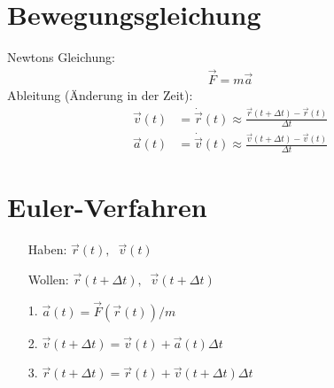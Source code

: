 \documentclass[a4paper, 14pt, fleqn, notitlepage]{scrartcl}
\begin{document}
\vspace{1em}
\begin{center}
  \color{black!50!white}{\rule{\textwidth}{1pt}}
\end{center}
\vspace{-1.5em}
\begin{minipage}[t]{0.5\paperwidth}
  \section{Bewegungsgleichung}

  Newtons Gleichung:
  \begin{align*}
    \vec{F} = m \vec{a}
  \end{align*}
  Ableitung (Änderung in der Zeit):
  \begin{align*}
    \vec{v}(t) &= \dot{\vec{r}}(t) \approx \frac{\vec{r}(t + \Delta t) - \vec{r}(t)}{\Delta t}\\[0.6em]
    \vec{a}(t) &= \dot{\vec{v}}(t) \approx \frac{\vec{v}(t + \Delta t) - \vec{v}(t)}{\Delta t}
  \end{align*}
\end{minipage}
%
\begin{minipage}[t]{0.5\paperwidth}
  \section{Euler-Verfahren}

  \begin{itemize}\setlength{\itemsep}{0.5em}
  \item[Haben:] $\vec{r}(t), \;\; \vec{v}(t)$
  \item[Wollen:] $\vec{r}(t + \Delta t), \;\; \vec{v}(t + \Delta t)$
  \item[1.] $\vec{a}(t) = \vec{F}(\vec{r}(t)) / m$
  \item[2.] $\vec{v}(t + \Delta t) = \vec{v}(t) + \vec{a}(t) \Delta t$
  \item[3.] $\vec{r}(t + \Delta t) = \vec{r}(t) + \vec{v}(t + \Delta t) \Delta t$
  \end{itemize}
\end{minipage}
\end{document}
